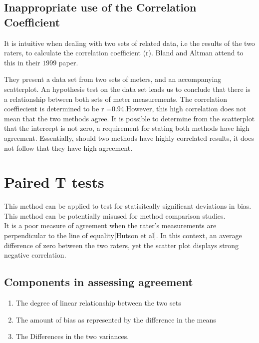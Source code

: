 \documentclass[MAIN.tex]{subfiles}
\begin{document}
\subsection{Inappropriate use of the Correlation Coefficient}
	It is intuitive when dealing with two sets of related data, i.e
	the results of the two raters,  to calculate the correlation
	coefficient (r). Bland and Altman attend to this in their $1999$
	paper.
	
	They present a data set from two sets of meters, and an
	accompanying scatterplot. An hypothesis test on the data set leads
	us to conclude that there is a relationship between both sets of
	meter measurements. The correlation coeffiecient is determined to
	be r =0.94.However, this high correlation does not mean that the
	two methods agree. It is possible to determine from the
	scatterplot that the intercept is not zero, a requirement for
	stating both methods have high agreement. Essentially, should two
	methods have highly correlated results, it does not follow that
	they have high agreement.
	
\section{Paired T tests}
This method can be applied to test for statisitcally significant
deviations in bias. This method can be potentially misused for
method comparison studies.
\\It is a poor measure of agreement when the rater's measurements
are perpendicular to the line of equality[Hutson et al]. In this
context, an average difference of zero between the two raters, yet
the scatter plot displays strong negative correlation.

\subsection*{Components in assessing agreement}

\begin{enumerate}
	\item The degree of linear relationship between the two sets \item
	The amount of bias as represented by the difference in the
	means\item The Differences in the two variances.
\end{enumerate}





\end{document}
